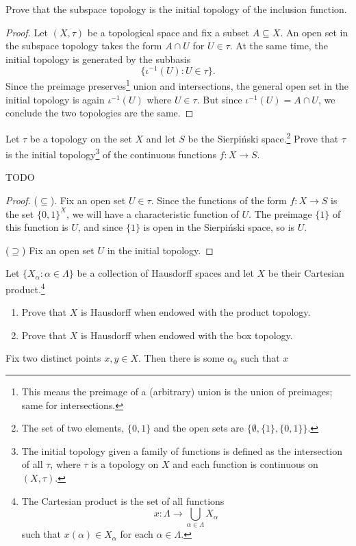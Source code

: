 \documentclass[../../main.tex]{subfiles}
\begin{document}
\begin{problem}[6]
    Prove that the subspace topology is the initial topology of the inclusion function.
\end{problem}
\begin{proof}
    Let $(X, \tau)$ be a topological space and fix a subset $A \subseteq X$.
    An open set in the subspace topology takes the form $A \cap U$ for $U \in \tau$.
    At the same time, the initial topology is generated by the subbasis
    \[
        \{ \iota^{-1}(U) : U \in \tau \}.
    \]
    Since the preimage preserves\footnote{This means the preimage of a (arbitrary) union is the union of preimages; same for intersections.} union and intersections, the general open set in the initial topology is again $\iota^{-1}(U)$ where $U \in \tau$.
    But since $\iota^{-1}(U) = A \cap U$, we conclude the two topologies are the same.
\end{proof}

\begin{problem}[7]
Let $\tau$ be a topology on the set $X$ and let $S$ be the Sierpi\'nski space.\footnote{
	The set of two elements, $\{0, 1\}$ and the open sets are $\{ \emptyset, \{1\}, \{0, 1\} \}$.}
Prove that $\tau$ is the initial topology\footnote{The initial topology given a family of functions is defined as the intersection of all $\tau$, where $\tau$ is a topology on $X$ and each function is continuous on $(X, \tau)$.}
of the continuous functions $f : X \to S$.
\end{problem}
{\huge TODO}
\begin{proof}
	($\subseteq$). Fix an open set $U \in \tau$.
	Since the functions of the form $f : X \to S$ is the set $\{0, 1\}^X$, we will have a characteristic function of $U$.
	The preimage $\{1\}$ of this function is $U$, and since $\{1\}$ is open in the Sierpi\'nski space, so is $U$.

	($\supseteq$) Fix an open set $U$ in the initial topology.
\end{proof}

\begin{problem}
    Let $\{ X_\alpha : \alpha \in \Lambda \}$ be a collection of Hausdorff spaces and let $X$ be their Cartesian product.\footnote{
        The Cartesian product is the set of all functions
        \[ x : \Lambda \to \bigcup_{\alpha \in \Lambda} X_\alpha \]
        such that $x(\alpha) \in X_\alpha$ for each $\alpha \in \Lambda$.
    }
\end{problem}
\begin{enumerate}[label=(\alph*)]
	\item Prove that $X$ is Hausdorff when endowed with the product topology.
	\item Prove that $X$ is Hausdorff when endowed with the box topology.
\end{enumerate}
Fix two distinct points $x, y \in X$.
Then there is some $\alpha_0$ such that $x$
\end{document}
